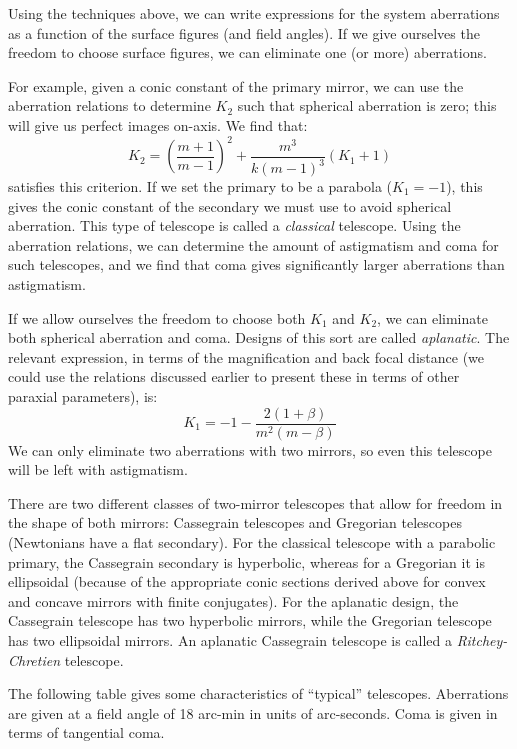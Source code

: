 \documentclass[12pt]{article}
\begin{document}
Using the techniques above, we can write expressions for the system
aberrations as a function of the surface figures (and field angles).
If we give ourselves the freedom to choose surface figures, we can
eliminate one (or more) aberrations.

For example, given a conic constant of the primary mirror, we can use
the aberration relations to determine $K_2$ such that spherical
aberration is zero; this will give us perfect images on-axis. We find
that:{$$
    K_2 = \left(\frac{m+1}{m-1}\right)^2 +
    \frac{m^{3}}{k\left(m-1\right)^{3}}\left(K_{1}+1\right)
$$}satisfies this criterion.  If we set the primary to be a parabola
($K_{1} = -1$), this gives the conic constant of the secondary we must use to
avoid spherical aberration. This type of telescope is called a
\emph{classical} telescope. Using the aberration relations, we can determine
the amount of astigmatism and coma for such telescopes, and we find
that coma gives significantly larger aberrations than astigmatism.

If we allow ourselves the freedom to choose both $K_1$ and $K_2$,
we can eliminate both spherical aberration and coma.
Designs of this sort are called \emph{aplanatic}.
The relevant expression, in terms of the magnification and
back focal distance (we could use the relations discussed earlier to
present these in terms of other paraxial parameters), is:{$$
    K_{1} = -1 - \frac{2(1+\beta)}{m^{2}(m-\beta)}
$$}We can only eliminate two aberrations with two mirrors, so even this
telescope will be left with astigmatism.

There are two different classes of two-mirror telescopes that allow
for freedom in the shape of both mirrors: Cassegrain telescopes and
Gregorian telescopes (Newtonians have a flat secondary). For the
classical telescope with a parabolic primary, the Cassegrain
secondary is hyperbolic, whereas for a Gregorian it is ellipsoidal
(because of the appropriate conic sections derived above for convex
and concave mirrors with finite conjugates). For the aplanatic
design, the Cassegrain telescope has two hyperbolic mirrors, while
the Gregorian telescope has two ellipsoidal mirrors. An aplanatic
Cassegrain telescope is called a \emph{Ritchey-Chretien} telescope.

The following table gives some characteristics of ``typical''
telescopes. Aberrations are given at a field angle of 18 arc-min in
units of arc-seconds. Coma is given in terms of tangential coma.
\end{document}
